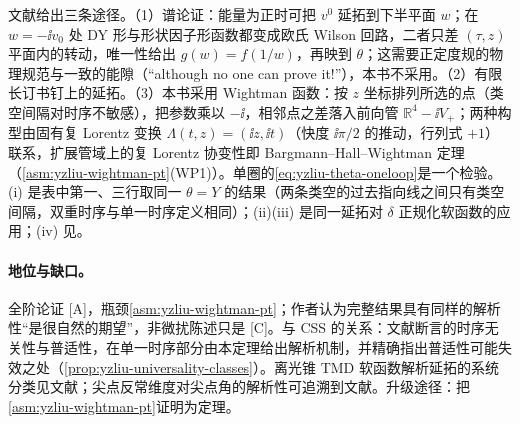 \begin{proofsketch}
文献\cite[第~4.5--4.7~节，附录~F、H]{Liu:2022nnk}给出三条途径。（1）谱论证：能量为正时可把 $v^0$ 延拓到下半平面 $w$；在 $w=-\ii v_0$ 处 DY 形与形状因子形函数都变成欧氏 Wilson 回路，二者只差 $(\tau,z)$ 平面内的转动，唯一性给出 $g(w)=f(1/w)$，再映到 $\theta$\cite[式~(124)--(134)]{Liu:2022nnk}；这需要正定度规的物理规范与一致的能隙（“although no one can prove it!”），本书不采用。（2）有限长订书钉上的延拓。（3）本书采用 Wightman 函数：按 $z$ 坐标排列所选的点（类空间隔对时序不敏感），把参数乘以 $-\ii$，相邻点之差落入前向管 $\mathbb R^4-\ii V_+$；两种构型由固有复 Lorentz 变换 $\Lambda(t,z)=(\ii z,\ii t)$（快度 $\ii\pi/2$ 的推动，行列式 $+1$）联系，扩展管域上的复 Lorentz 协变性即 Bargmann--Hall--Wightman 定理（\cref{asm:yzliu-wightman-pt}(WP1)）。单圈的\cref{eq:yzliu-theta-oneloop}是一个检验。(i) 是表中第一、三行取同一 $\theta=Y$ 的结果（两条类空的过去指向线之间只有类空间隔，双重时序与单一时序定义相同）；(ii)(iii) 是同一延拓对 $\delta$ 正规化软函数的应用；(iv) 见\cite[式~(H.7)--(H.11)]{Liu:2022nnk}。
\end{proofsketch}

\paragraph{地位与缺口。}全阶论证 [A]，瓶颈\cref{asm:yzliu-wightman-pt}；作者认为完整结果具有同样的解析性“是很自然的期望”，非微扰陈述只是 [C]。与 CSS 的关系：文献\cite{Collins2011,CollinsMetz2004}断言的时序无关性与普适性，在单一时序部分由本定理给出解析机制，并精确指出普适性可能失效之处（\cref{prop:yzliu-universality-classes}）。离光锥 TMD 软函数解析延拓的系统分类见文献\cite{Liu:2022nnk}；尖点反常维度对尖点角的解析性可追溯到文献\cite{KorchemskyRadyushkin1987}。升级途径：把\cref{asm:yzliu-wightman-pt}证明为定理。

